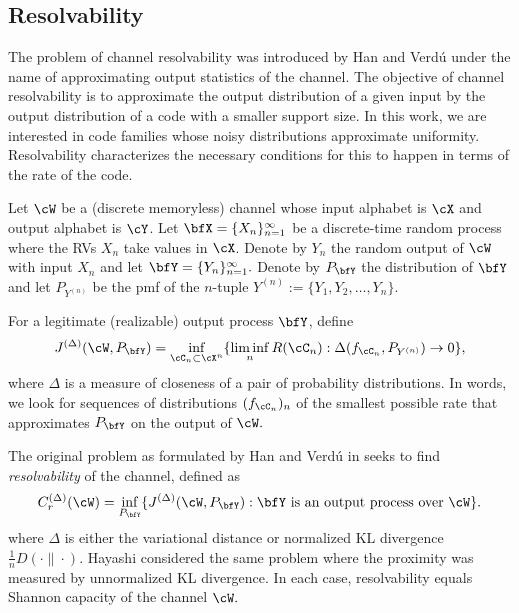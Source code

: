 \documentclass{amsart}
\theoremstyle{remark}
\begin{document}
\subsection{Resolvability}
The problem of channel resolvability was introduced by Han and Verd{\'u}  \cite{han1993approximation} under the name of approximating output statistics of the channel. 
The objective of channel resolvability is to approximate the output distribution of a given input  by the output distribution of a code with a smaller support size. 
In this work, we are interested in code families whose noisy distributions approximate uniformity. Resolvability characterizes the necessary conditions for this to happen in terms of the rate of the code. 

Let $\cW$ be a (discrete memoryless) channel whose input alphabet is $\cX$ and output alphabet is $\cY$. Let $\bfX=\{X_n\}_{n=1}^{\infty}$ be a discrete-time random process where the RVs $X_n$ take
values in $\cX$. Denote by $Y_n$ the random output of $\cW$ with input $X_n$ and
let $\bfY= \{Y_n\}_{n=1}^{\infty}.$ 
Denote by $P_\bfY$ the distribution of $\bfY$ and let $P_{Y^{(n)}}$ be
the pmf of the $n$-tuple $Y^{(n)}:= \{Y_1,Y_2,\dots,Y_n\}$.

For a legitimate (realizable) output process $\bfY$, define 
\begin{align}\label{eq:JDelta}
    J^{(\Delta)}(\cW,P_{\bfY}) = \inf_{\cC_n \subset \cX^n} \{\liminf_{n} R(\cC_n): \Delta(f_{\cC_n}, P_{Y^{(n)}}) \rightarrow 0 \},
\end{align}
where $\Delta$ is a measure of closeness of a pair of probability distributions. 
In words, we look for sequences of distributions $(f_{\cC_n})_n$ of the smallest possible rate that approximates $P_{\bfY}$ on the output of $\cW.$ 

The original problem as formulated by Han and Verd{\'u} in \cite{han1993approximation} seeks to find {\em resolvability} of the channel, defined as
\begin{align}\label{eq:resolvability}
    C_r^{(\Delta)}(\cW) = \inf_{P_{\bfY}}\{J^{(\Delta)}(\cW,P_{\bfY}): {\bfY} \text{ is an output process over } \cW \}.
\end{align}
where $\Delta$ is either the variational distance or normalized KL divergence $\frac1nD(\cdot\|\cdot).$ Hayashi \cite{hayashi2006general} considered the same problem where the proximity was measured by unnormalized KL divergence. In each case, resolvability equals Shannon capacity of the channel $\cW.$
\end{document}
